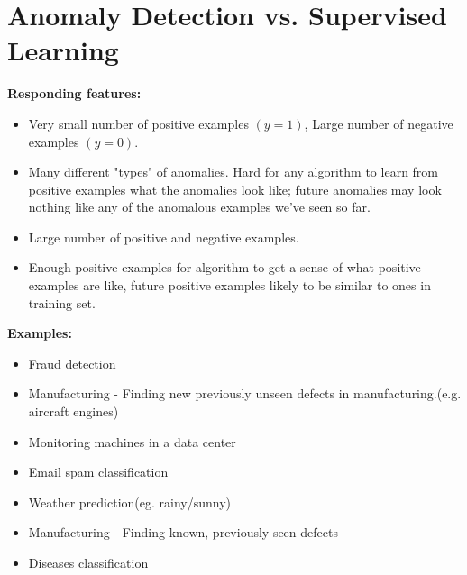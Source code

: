 \section{Anomaly Detection vs. Supervised Learning}
\textbf{Responding features: }

\noindent
\begin{minipage}{0.49\textwidth}
    \begin{itemize}
        \item Very small number of positive examples $(y=1)$, Large number of negative examples $(y=0)$.
        \item Many different "types" of anomalies. 
        Hard for any algorithm to learn from positive examples what the anomalies look like;
        future anomalies may look nothing like any of the anomalous examples we've seen so far.
    \end{itemize}
\end{minipage}
\vline
\begin{minipage}{0.49\textwidth}
    \begin{itemize}
        \item Large number of positive and  negative examples.
        \item Enough positive examples for algorithm to get a sense of what positive examples are like, future positive examples likely to be similar to ones in training set.
    \end{itemize}
\end{minipage}

\vspace{3em}

\textbf{Examples:}

\noindent
\begin{minipage}{0.49\textwidth}
    \begin{itemize}
        \item Fraud detection
        \item Manufacturing - Finding new previously unseen defects in manufacturing.(e.g. aircraft engines)
        \item Monitoring machines in a data center
    \end{itemize}
\end{minipage}
\vline
\begin{minipage}{0.49\textwidth}
    \begin{itemize}
        \item Email spam classification
        \item Weather prediction(eg. rainy/sunny)
        \item Manufacturing - Finding known, previously seen defects
        \item Diseases classification
    \end{itemize}
\end{minipage}

